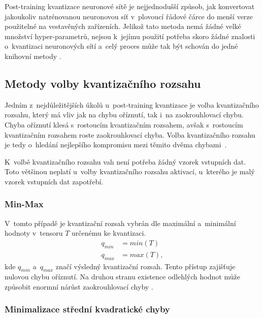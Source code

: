 Post-training kvantizace neuronové sítě je nejjednodušší způsob, jak konvertovat jakoukoliv natrénovanou neuronovou síť v~plovoucí řádové čárce do menší verze použitelné na vestavěných zařízeních. Jelikož tato metoda nemá žádné velké množství hyper-parametrů, nejsou k~jejímu použití potřeba skoro žádné znalosti o~kvantizaci neuronových sítí a~celý proces může tak být schován do jedné  knihovní metody \cite{nagel2021white}.

\subsection{Metody volby kvantizačního rozsahu}
\label{quant_range}

Jedním z~nejdůležitějších úkolů u~post-training kvantizace je volba kvantizačního rozsahu, který má vliv jak na chybu oříznutí, tak i~na zaokrouhlovací chybu. Chyba oříznutí klesá s~rostoucím kvantizačním rozsahem, avšak s~rostoucím kvantizačním rozsahem roste zaokrouhlovací chyba. Volba kvantizačního rozsahu je tedy o~hledání nejlepšího kompromisu mezi těmito dvěma chybami~\cite{nagel2021white}.

K~volbě kvantizačního rozsahu vah není potřeba žádný vzorek vstupních dat. Toto většinou neplatí u~volby kvantizačního rozsahu aktivací, u~kterého je malý vzorek vstupních dat zapotřebí.

\subsubsection{Min-Max}
\label{section:min-max}

V~tomto případě je kvantizační rozsah vybrán dle maximální a~minimální hodnoty v~tensoru $T$ určenému ke kvantizaci.
\begin{equation}
\begin{split}
    q_{min} &= min(T) \\
    q_{max} &= max(T),
\end{split}
\end{equation}
kde $q_{min}$ a~$q_{max}$ značí výsledný kvantizační rozsah. Tento přístup zajišťuje nulovou chybu oříznutí. Na druhou stranu existence odlehlých hodnot může způsobit enormní nárůst zaokrouhlovací chyby \cite{nagel2021white}.

\subsubsection{Minimalizace střední kvadratické chyby}

